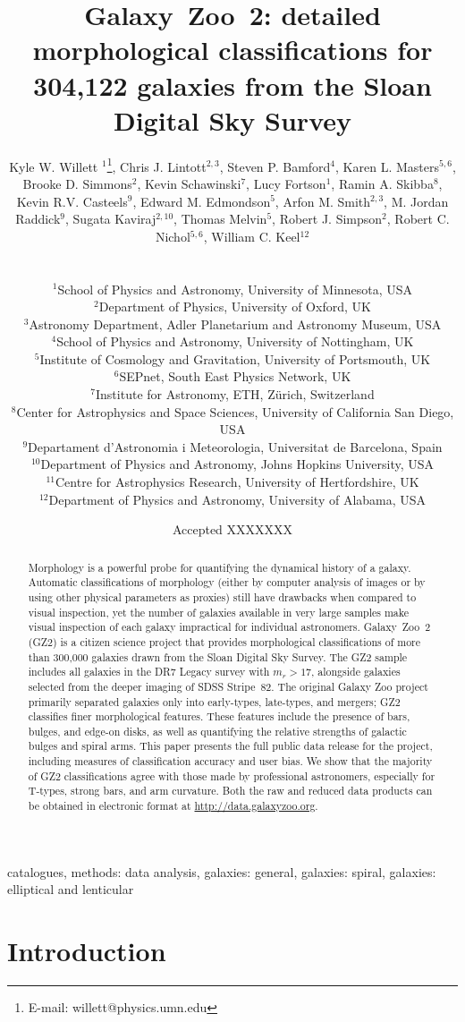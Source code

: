 \documentclass[useAMS,usenatbib]{mn2e}
\title[Galaxy Zoo 2 data release]{Galaxy~Zoo~2: detailed morphological classifications for 304,122 galaxies from the Sloan Digital Sky Survey}
\author[Willett et al.]{
  \parbox[t]{16cm}{
  Kyle W. Willett $^{1}$\thanks{E-mail: willett@physics.umn.edu},
  Chris J. Lintott$^{2,3}$,
  Steven P. Bamford$^{4}$,
  Karen L. Masters$^{5,6}$,
  Brooke D. Simmons$^{2}$,
  Kevin Schawinski$^{7}$,
  Lucy Fortson$^{1}$,
  Ramin A. Skibba$^{8}$,
  Kevin R.V. Casteels$^{9}$,
  Edward M. Edmondson$^{5}$,
  Arfon M. Smith$^{2,3}$,
  M. Jordan Raddick$^{9}$,
  Sugata Kaviraj$^{2,10}$,
  Thomas Melvin$^{5}$,
  Robert J. Simpson$^{2}$,
  Robert C. Nichol$^{5,6}$,
  William C. Keel$^{12}$
  \\
  }\\
$^{1}$School of Physics and Astronomy, University of Minnesota, USA \\
$^{2}$Department of Physics, University of Oxford, UK \\
$^{3}$Astronomy Department, Adler Planetarium and Astronomy Museum, USA \\
$^{4}$School of Physics and Astronomy, University of Nottingham, UK \\
$^{5}$Institute of Cosmology and Gravitation, University of Portsmouth, UK \\
$^{6}$SEPnet, South East Physics Network, UK \\
$^{7}$Institute for Astronomy, ETH, Z\"urich, Switzerland \\
$^{8}$Center for Astrophysics and Space Sciences, University of California San Diego, USA \\
$^{9}$Departament d'Astronomia i Meteorologia, Universitat de Barcelona, Spain \\
$^{10}$Department of Physics and Astronomy, Johns Hopkins University, USA \\
$^{11}$Centre for Astrophysics Research, University of Hertfordshire, UK \\
$^{12}$Department of Physics and Astronomy, University of Alabama, USA \\
}
\begin{document}
\date{Accepted XXXXXXX}

\pagerange{\pageref{firstpage}--\pageref{lastpage}} 

\maketitle

\label{firstpage}

\begin{abstract}
Morphology is a powerful probe for quantifying the dynamical history of a galaxy. Automatic classifications of morphology (either by computer analysis of images or by using other physical parameters as proxies) still have drawbacks when compared to visual inspection, yet the number of galaxies available in very large samples make visual inspection of each galaxy impractical for individual astronomers. Galaxy~Zoo~2 (GZ2) is a citizen science project that provides morphological classifications of more than 300,000 galaxies drawn from the Sloan Digital Sky Survey. The GZ2 sample includes all galaxies in the DR7 Legacy survey with $m_r>17$, alongside galaxies selected from the deeper imaging of SDSS Stripe~82. The original Galaxy Zoo project primarily separated galaxies only into early-types, late-types, and mergers; GZ2 classifies finer morphological features. These features include the presence of bars, bulges, and edge-on disks, as well as quantifying the relative strengths of galactic bulges and spiral arms. This paper presents the full public data release for the project, including measures of classification accuracy and user bias. We show that the majority of GZ2 classifications agree with those made by professional astronomers, especially for T-types, strong bars, and arm curvature. Both the raw and reduced data products can be obtained in electronic format at \url{http://data.galaxyzoo.org}.
\end{abstract}

\begin{keywords}
catalogues, methods: data analysis, galaxies: general, galaxies: spiral, galaxies: elliptical and lenticular
\end{keywords}


\section{Introduction} \label{sec-intro}
\end{document}
